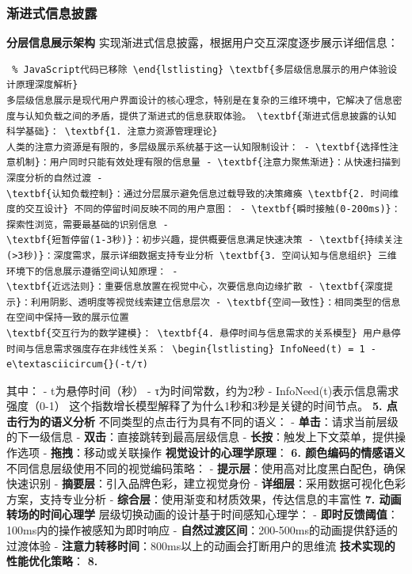 {{{{{\subsubsection{渐进式信息披露}\label{ux6e10ux8fdbux5f0fux4fe1ux606fux62abux9732} \textbf{分层信息展示架构} 实现渐进式信息披露，根据用户交互深度逐步展示详细信息：
\begin{lstlisting} % JavaScript代码已移除 \end{lstlisting} \textbf{多层级信息展示的用户体验设计原理深度解析}
多层级信息展示是现代用户界面设计的核心理念，特别是在复杂的三维环境中，它解决了信息密度与认知负载之间的矛盾，提供了渐进式的信息获取体验。 \textbf{渐进式信息披露的认知科学基础}： \textbf{1. 注意力资源管理理论}
人类的注意力资源是有限的，多层级展示系统基于这一认知限制设计： - \textbf{选择性注意机制}：用户同时只能有效处理有限的信息量 - \textbf{注意力聚焦渐进}：从快速扫描到深度分析的自然过渡 -
\textbf{认知负载控制}：通过分层展示避免信息过载导致的决策瘫痪 \textbf{2. 时间维度的交互设计} 不同的停留时间反映不同的用户意图： - \textbf{瞬时接触(0-200ms)}：探索性浏览，需要最基础的识别信息 -
\textbf{短暂停留(1-3秒)}：初步兴趣，提供概要信息满足快速决策 - \textbf{持续关注(>3秒)}：深度需求，展示详细数据支持专业分析 \textbf{3. 空间认知与信息组织} 三维环境下的信息展示遵循空间认知原理： -
\textbf{近远法则}：重要信息放置在视觉中心，次要信息向边缘扩散 - \textbf{深度提示}：利用阴影、透明度等视觉线索建立信息层次 - \textbf{空间一致性}：相同类型的信息在空间中保持一致的展示位置
\textbf{交互行为的数学建模}： \textbf{4. 悬停时间与信息需求的关系模型} 用户悬停时间与信息需求强度存在非线性关系： \begin{lstlisting} InfoNeed(t) = 1 -
e\textasciicircum{}(-t/τ) \end{lstlisting} 其中： - t为悬停时间（秒） - τ为时间常数，约为2秒 - InfoNeed(t)表示信息需求强度（0-1）
这个指数增长模型解释了为什么1秒和3秒是关键的时间节点。 \textbf{5. 点击行为的语义分析} 不同类型的点击行为具有不同的语义： - \textbf{单击}：请求当前层级的下一级信息 -
\textbf{双击}：直接跳转到最高层级信息 - \textbf{长按}：触发上下文菜单，提供操作选项 - \textbf{拖拽}：移动或关联操作 \textbf{视觉设计的心理学原理}： \textbf{6. 颜色编码的情感语义}
不同信息层级使用不同的视觉编码策略： - \textbf{提示层}：使用高对比度黑白配色，确保快速识别 - \textbf{摘要层}：引入品牌色彩，建立视觉身份 - \textbf{详细层}：采用数据可视化色彩方案，支持专业分析 -
\textbf{综合层}：使用渐变和材质效果，传达信息的丰富性 \textbf{7. 动画转场的时间心理学} 层级切换动画的设计基于时间感知心理学： - \textbf{即时反馈阈值}：100ms内的操作被感知为即时响应 -
\textbf{自然过渡区间}：200-500ms的动画提供舒适的过渡体验 - \textbf{注意力转移时间}：800ms以上的动画会打断用户的思维流 \textbf{技术实现的性能优化策略}： \textbf{8.
}}}}}}
